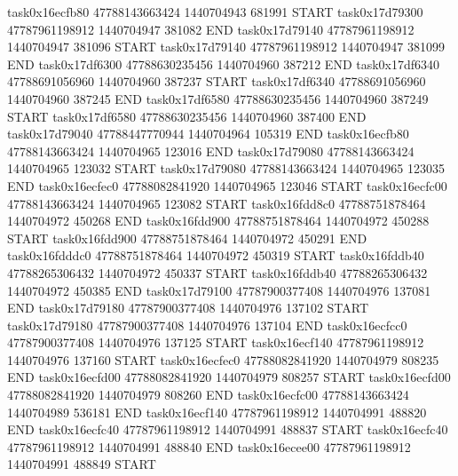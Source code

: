 task0x16ecfb80 47788143663424          1440704943               681991  START
task0x17d79300 47787961198912          1440704947               381082  END
task0x17d79140 47787961198912          1440704947               381096  START
task0x17d79140 47787961198912          1440704947               381099  END
task0x17df6300 47788630235456          1440704960               387212  END
task0x17df6340 47788691056960          1440704960               387237  START
task0x17df6340 47788691056960          1440704960               387245  END
task0x17df6580 47788630235456          1440704960               387249  START
task0x17df6580 47788630235456          1440704960               387400  END
task0x17d79040 47788447770944          1440704964               105319  END
task0x16ecfb80 47788143663424          1440704965               123016  END
task0x17d79080 47788143663424          1440704965               123032  START
task0x17d79080 47788143663424          1440704965               123035  END
task0x16ecfec0 47788082841920          1440704965               123046  START
task0x16ecfc00 47788143663424          1440704965               123082  START
task0x16fdd8c0 47788751878464          1440704972               450268  END
task0x16fdd900 47788751878464          1440704972               450288  START
task0x16fdd900 47788751878464          1440704972               450291  END
task0x16fdddc0 47788751878464          1440704972               450319  START
task0x16fddb40 47788265306432          1440704972               450337  START
task0x16fddb40 47788265306432          1440704972               450385  END
task0x17d79100 47787900377408          1440704976               137081  END
task0x17d79180 47787900377408          1440704976               137102  START
task0x17d79180 47787900377408          1440704976               137104  END
task0x16ecfcc0 47787900377408          1440704976               137125  START
task0x16ecf140 47787961198912          1440704976               137160  START
task0x16ecfec0 47788082841920          1440704979               808235  END
task0x16ecfd00 47788082841920          1440704979               808257  START
task0x16ecfd00 47788082841920          1440704979               808260  END
task0x16ecfc00 47788143663424          1440704989               536181  END
task0x16ecf140 47787961198912          1440704991               488820  END
task0x16ecfc40 47787961198912          1440704991               488837  START
task0x16ecfc40 47787961198912          1440704991               488840  END
task0x16ecee00 47787961198912          1440704991               488849  START
